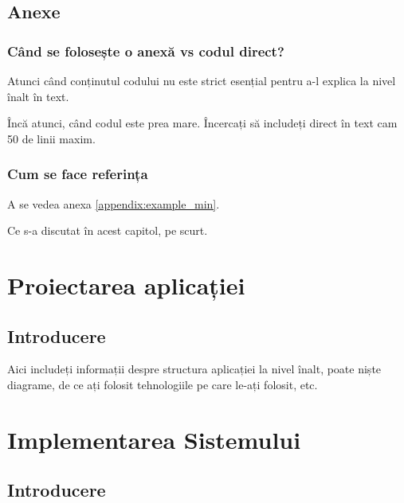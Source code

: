 \documentclass[a4paper,12pt]{report}
\begin{document}

\section{Anexe}

\subsection{Când se folosește o anexă vs codul direct?}

Atunci când conținutul codului nu este strict esențial 
pentru a-l explica la nivel înalt în text.

Încă atunci, când codul este prea mare. 
Încercați să includeți direct în text cam 50 de linii maxim.

\subsection{Cum se face referința}

A se vedea anexa \ref{appendix:example_min}.


Ce s-a discutat în acest capitol, pe scurt.


\chapter{Proiectarea aplicației}\label{architecture_chapter_title}

\section{Introducere}

Aici includeți informații despre structura aplicației la nivel înalt, 
poate niște diagrame, de ce ați folosit tehnologiile pe care le-ați folosit, etc.


\chapter{Implementarea Sistemului}\label{implementation_chapter_title}

\section{Introducere}
\end{document}
